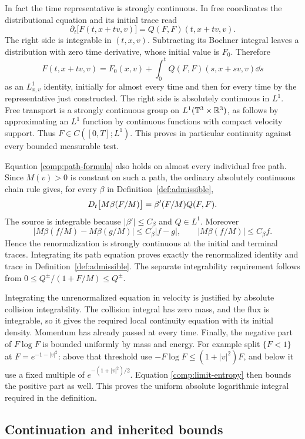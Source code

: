 In fact the time representative is strongly continuous. In free
coordinates the distributional equation and its initial trace read
\[
\partial_t\bigl[F(t,x+tv,v)\bigr]=Q(F,F)(t,x+tv,v).
\]
The right side is integrable in \((t,x,v)\). Subtracting its Bochner
integral leaves a distribution with zero time derivative, whose initial
value is \(F_0\). Therefore
\begin{equation}\label{comp:path-formula}
F(t,x+tv,v)=F_0(x,v)
 +\int_0^t Q(F,F)(s,x+sv,v)\dd s
\end{equation}
as an \(L^1_{x,v}\) identity, initially for almost every time and then
for every time by the representative just constructed. The right side
is absolutely continuous in \(L^1\). Free transport is a strongly
continuous group on \(L^1(\mathbb T^3\times\mathbb R^3)\), as follows by
approximating an \(L^1\) function by continuous functions with compact
velocity support. Thus \(F\in C([0,T];L^1)\). This proves in
particular continuity against every bounded measurable test.

Equation \eqref{comp:path-formula} also holds on almost every individual
free path. Since \(M(v)>0\) is constant on such a path, the ordinary
absolutely continuous chain rule gives, for every \(\beta\) in
Definition~\ref{def:admissible},
\[
D_t\bigl[M\beta(F/M)\bigr]=\beta'(F/M)Q(F,F).
\]
The source is integrable because \(|\beta'|\leq C_\beta\) and
\(Q\in L^1\). Moreover
\[
|M\beta(f/M)-M\beta(g/M)|\leq C_\beta|f-g|,
\qquad |M\beta(f/M)|\leq C_\beta f.
\]
Hence the renormalization is strongly continuous at the initial and
terminal traces. Integrating its path equation proves exactly the
renormalized identity and trace in Definition~\ref{def:admissible}.
The separate integrability requirement follows from
\(0\leq Q^\pm/(1+F/M)\leq Q^\pm\).

Integrating the unrenormalized equation in velocity is justified by
absolute collision integrability. The collision integral has zero mass,
and the flux is integrable, so it gives the required local continuity
equation with its initial density. Momentum has already passed at every
time. Finally, the negative part of \(F\log F\) is bounded uniformly
by mass and energy. For example split \(\{F<1\}\) at
\(F=e^{-1-|v|^2}\): above that threshold use
\(-F\log F\leq(1+|v|^2)F\), and below it use a fixed multiple of
\(e^{-(1+|v|^2)/2}\). Equation \eqref{comp:limit-entropy} then bounds
the positive part as well. This proves the uniform absolute logarithmic
integral required in the definition.

\subsection{Continuation and inherited bounds}

